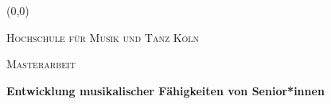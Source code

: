 \begin{titlepage}
	\begin{addmargin}{\offsetCoverPage} 
		
		\setlength{\unitlength}{1cm}
		\begin{picture}(0,0)
		\end{picture}
		\begin{center}
			{\scshape\LARGE Hochschule für Musik und Tanz Köln\par}
		\end{center}\centering
	
	\end{addmargin}
		\addvspace{2.6cm}
		\begin{addmargin}[\marginCoverPage]{0cm}
			\begin{center}
				{\scshape\Large Masterarbeit\par}
			\end{center}
			
	\vspace{1.5cm}
	{\huge\bfseries Entwicklung musikalischer Fähigkeiten von Senior*innen\par}




\end{addmargin}
\end{titlepage}
